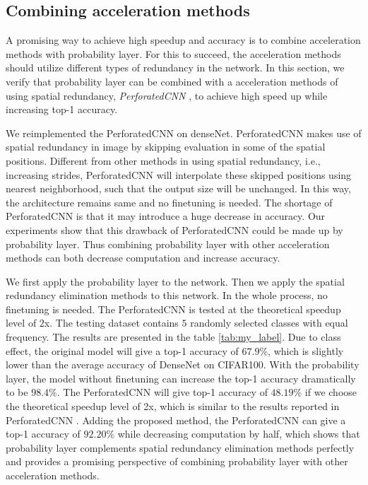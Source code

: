 \documentclass{article}
\begin{document}
\subsection{Combining acceleration methods}
A promising way to achieve high speedup and accuracy is to combine acceleration methods with probability layer. For this to succeed, the acceleration methods should utilize different types of redundancy in the network. In this section, we verify that probability layer can be combined with a acceleration methods of using spatial redundancy, \textit{PerforatedCNN} \cite{figurnov2016perforatedcnns}, to achieve high speed up while increasing top-1 accuracy.

We reimplemented the PerforatedCNN \cite{figurnov2016perforatedcnns} on denseNet. PerforatedCNN makes use of spatial redundancy in image by skipping evaluation in some of the spatial positions. Different from other methods in using spatial redundancy, i.e., increasing strides, PerforatedCNN will interpolate these skipped positions using nearest neighborhood, such that the output size will be unchanged. In this way, the architecture remains same and no finetuning is needed. The shortage of PerforatedCNN is that it may introduce a huge decrease in accuracy. Our experiments show that this drawback of PerforatedCNN could be made up by probability layer. Thus combining probability layer with other acceleration methods can both decrease computation and increase accuracy.

We first apply the probability layer to the network. Then we apply the spatial redundancy elimination methods to this network. In the whole process, no finetuning is needed. The PerforatedCNN is tested at the theoretical speedup level of 2x. The testing dataset contains $5$ randomly selected classes with equal frequency. The results are presented in the table \ref{tab:my_label}. Due to class effect, the original model will give a top-1 accuracy of $67.9\%$, which is slightly lower than the average accuracy of DenseNet on CIFAR100. With the probability layer, the model without finetuning can increase the top-1 accuracy dramatically to be $98.4\%$. The PerforatedCNN will give top-1 accuracy of $48.19\%$ if we choose the theoretical speedup level of 2x, which is similar to the results reported in PerforatedCNN \cite{figurnov2016perforatedcnns}. Adding the proposed method, the PerforatedCNN can give a top-1 accuracy of $92.20\%$ while decreasing computation by half, which shows that probability layer complements spatial redundancy elimination methods perfectly and provides a promising perspective of combining probability layer with other acceleration methods.
\end{document}
